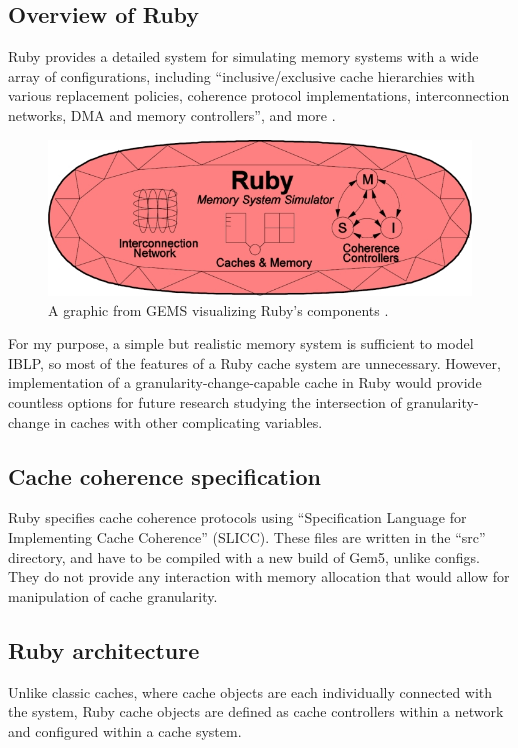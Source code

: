 \documentclass[12pt,twoside]{reedthesis}
\begin{document}
	\subsection*{Overview of Ruby}

	Ruby provides a detailed system for simulating memory systems with a wide array of configurations, including ``inclusive/exclusive cache hierarchies with various replacement policies, coherence protocol implementations, interconnection networks, DMA and memory controllers'', and more \cite{gem5-ruby}.

	\begin{figure}[h]
		\centering
		\includegraphics[width=4.5in]{figures/ruby.jpg}
		\caption{A graphic from GEMS visualizing Ruby's components \cite{gem5-ruby}.}
	\end{figure}

	For my purpose, a simple but realistic memory system is sufficient to model IBLP, so most of the features of a Ruby cache system are unnecessary. However, implementation of a granularity-change-capable cache in Ruby would provide countless options for future research studying the intersection of granularity-change in caches with other complicating variables.

	\subsection*{Cache coherence specification}

	Ruby specifies cache coherence protocols using ``Specification Language for Implementing Cache Coherence'' (SLICC). These files are written in the ``src'' directory, and have to be compiled with a new build of Gem5, unlike configs. They do not provide any interaction with memory allocation that would allow for manipulation of cache granularity.

	\subsection*{Ruby architecture}

	Unlike classic caches, where cache objects are each individually connected with the system, Ruby cache objects are defined as cache controllers within a network and configured within a cache system.
	
\end{document}
